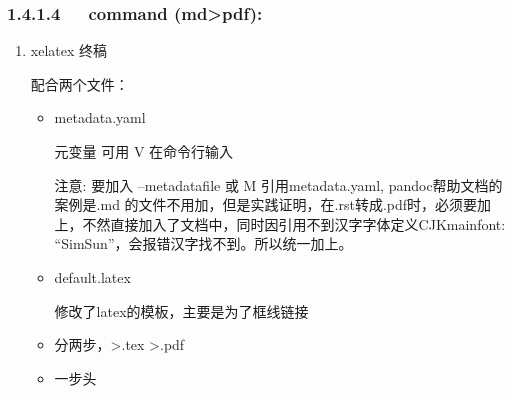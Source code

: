 \documentclass[letterpaper,12pt,english]{sphinxmanual}
\begin{document}
\subsubsection{1.4.1.4   command (md\sphinxhyphen{}>pdf):}
\label{\detokenize{001software/001install/pandoc:command-md-pdf}}\begin{enumerate}
%
\item {} 
xelatex 终稿

配合两个文件：
\begin{itemize}
\item {} 
metadata.yaml

元变量 可用 \sphinxhyphen{}V 在命令行输入

注意: 要加入 –metadata\sphinxhyphen{}file 或 \sphinxhyphen{}M 引用metadata.yaml, pandoc帮助文档的案例是.md 的文件不用加，但是实践证明，在.rst转成.pdf时，必须要加上，不然直接加入了文档中，同时因引用不到汉字字体定义CJKmainfont: “SimSun”，会报错汉字找不到。所以统一加上。

\item {} 
default.latex

修改了latex的模板，主要是为了框线链接

\item {} 
分两步，\sphinxhyphen{}>.tex \sphinxhyphen{}>.pdf

\begin{sphinxVerbatim}[commandchars=\\\{\}]
   \PYGZbs{}\PYGZbs{}        \PYGZbs{}\PYGZbs{}

 
\end{sphinxVerbatim}

\item {} 
一步头


\end{itemize}
\end{enumerate}
\end{document}
